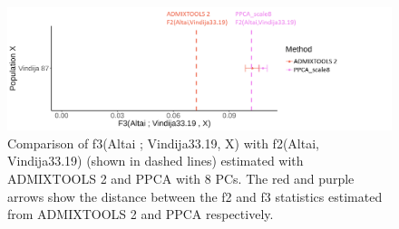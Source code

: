 \documentclass[12pt, letterpaper]{article}
\begin{document}
\begin{figure}[ht!]
    \includegraphics[width=16.5cm]{Images/Supplement/f2_f3_corr.png}
    \centering
    \caption{Comparison of f3(Altai ; Vindija33.19, X) with f2(Altai, Vindija33.19) (shown in dashed lines) estimated with ADMIXTOOLS 2 and PPCA with 8 PCs. The red and purple arrows show the distance between the f2 and f3 statistics estimated from ADMIXTOOLS 2 and PPCA respectively.} 
    \label{figS2:pc_scale}
\end{figure}
\end{document}
